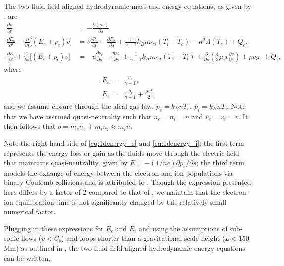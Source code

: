 \documentclass[apj]{emulateapj}
\begin{document}
	\appendix
	\section{}
	\label{appendix}
	\par The two-fluid field-aligned hydrodynamic mass and energy equations, as given by \citet{bradshaw_influence_2013}, are
	\begin{align}
		\frac{\partial\rho}{\partial t} &= -\frac{\partial(\rho v)}{\partial s} \label{eq:1dmass} \\[0.5em]
		\frac{\partial E_e}{\partial t} + \frac{\partial}{\partial s} \lbrack(E_e+p_e)v\rbrack &= v\frac{\partial p_e}{\partial s} - \frac{\partial F_{ce}}{\partial s} + \frac{1}{\gamma - 1}k_Bn\nu_{ei}(T_i-T_e) -n^2\Lambda(T_e)+Q_{e} , \label{eq:1denergy_e} \\[0.5em]
		\frac{\partial E_i}{\partial t} + \frac{\partial }{\partial s}\lbrack(E_i+p_i)v\rbrack &= -v\frac{\partial p_e}{\partial s} - \frac{\partial F_{ci}}{\partial s} + \frac{1}{\gamma - 1}k_Bn\nu_{ei}(T_e-T_i) + \frac{\partial}{\partial s}\left(\frac{4}{3}\mu_iv\frac{\partial v}{\partial s}\right) +\rho v g_{\parallel} + Q_{i},\label{eq:1denergy_i}
	\end{align}
	where
	\begin{align}
		E_e =& \frac{p_e}{\gamma - 1} \label{eq:ee_closure}, \\[0.5em]
		E_i =& \frac{p_i}{\gamma - 1} + \frac{\rho v^2}{2}, \label{eq:ei_closure}
	\end{align}
	and we assume closure through the ideal gas law, $p_e=k_BnT_e,\,p_i=k_BnT_i$. Note that we have assumed quasi-neutrality such that $n_e=n_i=n$ and $v_e=v_i=v$. It then follows that $\rho=m_en_e+m_in_i\approx m_in$.
	\par Note the right-hand side of \autoref{eq:1denergy_e} and \autoref{eq:1denergy_i}: the first term represents the energy loss or gain as the fluids move through the electric field that maintains quasi-neutrality, given by $E=-(1/ne)\partial p_e/\partial s$; the third term models the exhange of energy between the electron and ion populations via binary Coulomb collisions and is attributed to \citet{braginskii_transport_1965}. Though the expression presented here differs by a factor of 2 compared to that of \citeauthor{braginskii_transport_1965}, we maintain that the electron-ion equilibration time is not significantly changed by this relatively small numerical factor. 
	\par Plugging in these expressions for $E_e$ and $E_i$ and using the assumptions of sub-sonic flows ($v<C_s$) and loops shorter than a gravitational scale height ($L<150$ Mm) as outlined in \citet{klimchuk_highly_2008}, the two-fluid field-aligned hydrodynamic energy equations can be written,
\end{document}
